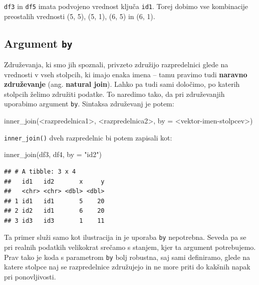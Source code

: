 \documentclass[
]{book}
\newenvironment{Shaded}{\begin{snugshade}}{\end{snugshade}}
\newcommand{\AttributeTok}[1]{\textcolor[rgb]{0.77,0.63,0.00}{#1}}
\newcommand{\FunctionTok}[1]{\textcolor[rgb]{0.00,0.00,0.00}{#1}}
\newcommand{\NormalTok}[1]{#1}
\newcommand{\SpecialCharTok}[1]{\textcolor[rgb]{0.00,0.00,0.00}{#1}}
\newcommand{\StringTok}[1]{\textcolor[rgb]{0.31,0.60,0.02}{#1}}
\begin{document}
\texttt{df3} in \texttt{df5} imata podvojeno vrednost ključa \texttt{id1}. Torej dobimo vse kombinacije preostalih vrednosti (5, 5), (5, 1), (6, 5) in (6, 1).

\hypertarget{argument-by}{%
\subsection{\texorpdfstring{Argument \texttt{by}}{Argument by}}\label{argument-by}}

Združevanja, ki smo jih spoznali, privzeto združijo razpredelnici glede na vrednosti v vseh stolpcih, ki imajo enaka imena -- tamu pravimo tudi \textbf{naravno združevanje} (ang. \textbf{natural join}). Lahko pa tudi sami določimo, po katerih stolpcih želimo združiti podatke. To naredimo tako, da pri združevanjih uporabimo argument \texttt{by}. Sintaksa združevanj je potem:

\begin{Shaded}
\begin{Highlighting}[]
\FunctionTok{inner\_join}\NormalTok{(}\SpecialCharTok{\textless{}}\NormalTok{razpredelnica1}\SpecialCharTok{\textgreater{}}\NormalTok{, }\SpecialCharTok{\textless{}}\NormalTok{razpredelnica2}\SpecialCharTok{\textgreater{}}\NormalTok{, }\AttributeTok{by =} \SpecialCharTok{\textless{}}\NormalTok{vektor}\SpecialCharTok{{-}}\NormalTok{imen}\SpecialCharTok{{-}}\NormalTok{stolpcev}\SpecialCharTok{\textgreater{}}\NormalTok{)}
\end{Highlighting}
\end{Shaded}

\texttt{inner\_join()} dveh razpredelnic bi potem zapisali kot:

\begin{Shaded}
\begin{Highlighting}[]
\FunctionTok{inner\_join}\NormalTok{(df3, df4, }\AttributeTok{by =} \StringTok{"id2"}\NormalTok{)}
\end{Highlighting}
\end{Shaded}

\begin{verbatim}
## # A tibble: 3 x 4
##   id1   id2       x     y
##   <chr> <chr> <dbl> <dbl>
## 1 id1   id1       5    20
## 2 id2   id1       6    20
## 3 id3   id3       1    11
\end{verbatim}

Ta primer služi samo kot ilustracija in je uporaba \texttt{by} nepotrebna. Seveda pa se pri realnih podatkih velikokrat srečamo s stanjem, kjer ta argument potrebujemo. Prav tako je koda s parametrom \texttt{by} bolj robustna, saj sami definiramo, glede na katere stolpce naj se razpredelnice združujejo in ne more priti do kakšnih napak pri ponovljivosti.
\end{document}
